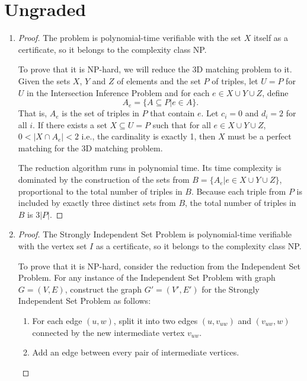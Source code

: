 \documentclass{article}
\begin{document}
\section*{Ungraded}

\begin{enumerate}[resume]
    \item \begin{proof}
        The problem is polynomial-time verifiable with the set $X$ itself as a certificate, so it belongs to the complexity class NP.

        To prove that it is NP-hard, we will reduce the 3D matching problem to it. Given the sets $X$, $Y$ and $Z$ of elements and the set $P$ of triples, let $U = P$ for $U$ in the Intersection Inference Problem and for each $e \in X \cup Y \cup Z$, define
        \[
            A_e = \{A \subseteq P| e \in A\}.
        \]
        That is, $A_e$ is the set of triples in $P$ that contain $e$. Let $c_i = 0$ and $d_i = 2$ for all $i$. If there exists a set $X \subseteq U = P$ such that for all $e \in X \cup Y \cup Z$, $0 < |X \cap A_e| < 2$ i.e., the cardinality is exactly 1, then $X$ must be a perfect matching for the 3D matching problem.
        
        The reduction algorithm runs in polynomial time. Its time complexity is dominated by the construction of the sets from $B = \{A_e| e \in X \cup Y \cup Z\}$, proportional to the total number of triples in $B$. Because each triple from $P$ is included by exactly three distinct sets from $B$, the total number of triples in $B$ is $3|P|$.
    \end{proof}

    \item \begin{proof}
        The Strongly Independent Set Problem is polynomial-time verifiable with the vertex set $I$ as a certificate, so it belongs to the complexity class NP.

        To prove that it is NP-hard, consider the reduction from the Independent Set Problem. For any instance of the Independent Set Problem with graph $G = (V, E)$, construct the graph $G' = (V', E')$ for the Strongly Independent Set Problem as follows:
        \begin{enumerate}
            \item For each edge $(u, w)$, split it into two edges $(u, v_{uw})$ and $(v_{uw}, w)$ connected by the new intermediate vertex $v_{uw}$.
            \item Add an edge between every pair of intermediate vertices.
        \end{enumerate}


\end{proof}
\end{enumerate}
\end{document}

